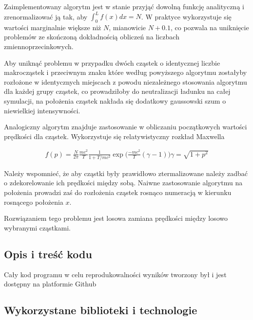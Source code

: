 
    Zaimplementowany algorytm jest w stanie przyjąć dowolną funkcję analityczną 
    i zrenormalizować ją tak, aby $\int_0^L f(x) dx = N$. W praktyce wykorzystuje się wartości marginalnie większe
    niż $N$, mianowicie $N+0.1$, co pozwala na uniknięcie problemów ze skończoną dokładnością obliczeń
    na liczbach zmiennoprzecinkowych.

    Aby uniknąć problemu w przypadku dwóch  cząstek o identycznej liczbie makrocząstek i przeciwnym znaku
    które według powyższego algorytmu zostałyby rozłożone w identycznych miejscach z powodu niezależnego
    stosowania algorytmu dla każdej grupy cząstek, co prowadziłoby do neutralizacji ładunku na całej symulacji,
    na położenia cząstek nakłada się dodatkowy gaussowski szum o niewielkiej intensywności.

    Analogiczny algorytm znajduje zastosowanie w obliczaniu początkowych wartości prędkości dla cząstek.
    Wykorzystuje się relatywistyczny rozkład Maxwella

    \begin{align}
        f(p) = \frac{N}{2 \pi} \frac{mc^2}{T} \frac{1}{1+T/mc^2} \exp \Big (\frac{-mc^2}{T}(\gamma -1) \Big)
        \gamma = \sqrt{1+p^2}
        \label{relativistic-maxwell-distribution}
    \end{align}

    Należy wspomnieć, że aby cząstki były prawidłowo ztermalizowane 
    należy zadbać o zdekorelowanie ich prędkości między sobą. Naiwne zastosowanie algorytmu na położenia
    prowadzi zaś do rozłożenia cząstek rosnąco numeracją w kierunku rosnącego położenia $x$.

    Rozwiązaniem tego problemu jest losowa zamiana prędkości między losowo wybranymi cząstkami.

    \subsection{Opis i treść kodu}
    Cały kod programu w celu reprodukowalności wyników tworzony był i jest dostępny na platformie Github 

    \subsection{Wykorzystane biblioteki i technologie}

